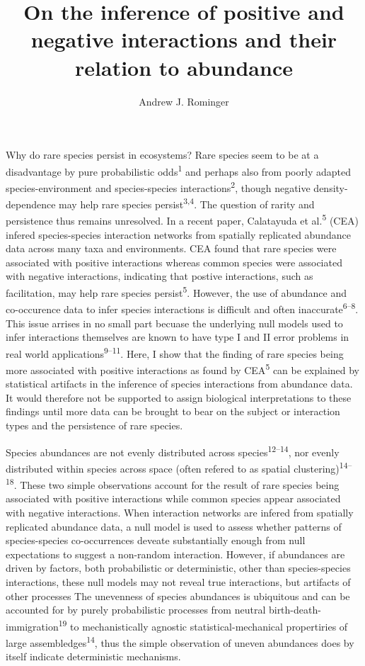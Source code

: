 \documentclass[]{article}
\title{On the inference of positive and negative interactions and their
relation to abundance}
\author{Andrew J. Rominger}
\date{}
\begin{document}
\maketitle

Why do rare species persist in ecosystems? Rare species seem to be at a
disadvantage by pure probabilistic odds\textsuperscript{1} and perhaps
also from poorly adapted species-environment and species-species
interactions\textsuperscript{2}, though negative density-dependence may
help rare species persist\textsuperscript{3,4}. The question of rarity
and persistence thus remains unresolved. In a recent paper, Calatayuda
et al.\textsuperscript{5} (CEA) infered species-species interaction
networks from spatially replicated abundance data across many taxa and
environments. CEA found that rare species were associated with positive
interactions whereas common species were associated with negative
interactions, indicating that postive interactions, such as
facilitation, may help rare species persist\textsuperscript{5}. However,
the use of abundance and co-occurence data to infer species interactions
is difficult and often inaccurate\textsuperscript{6--8}. This issue
arrises in no small part becuase the underlying null models used to
infer interactions themselves are known to have type I and II error
problems in real world applications\textsuperscript{9--11}. Here, I show
that the finding of rare species being more associated with positive
interactions as found by CEA\textsuperscript{5} can be explained by
statistical artifacts in the inference of species interactions from
abundance data. It would therefore not be supported to assign biological
interpretations to these findings until more data can be brought to bear
on the subject or interaction types and the persistence of rare species.

Species abundances are not evenly distributed across
species\textsuperscript{12--14}, nor evenly distributed within species
across space (often refered to as spatial
clustering)\textsuperscript{14--18}. These two simple observations
account for the result of rare species being associated with positive
interactions while common species appear associated with negative
interactions. When interaction networks are infered from spatially
replicated abundance data, a null model is used to assess whether
patterns of species-species co-occurrences deveate substantially enough
from null expectations to suggest a non-random interaction. However, if
abundances are driven by factors, both probabilistic or deterministic,
other than species-species interactions, these null models may not
reveal true interactions, but artifacts of other processes The
unevenness of species abundances is ubiquitous and can be accounted for
by purely probabilistic processes from neutral
birth-death-immigration\textsuperscript{19} to mechanistically agnostic
statistical-mechanical propertiries of large
assembledges\textsuperscript{14}, thus the simple observation of uneven
abundances does by itself indicate deterministic mechanisms.
\end{document}
